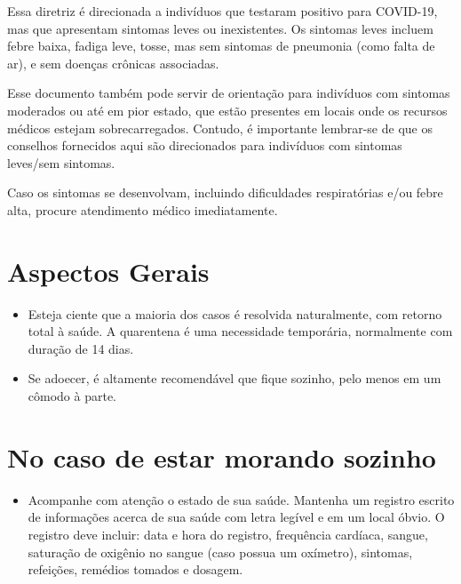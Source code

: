 \documentclass[onecolumn,journal]{IEEEtran}
\begin{document}


\begin{multicols}{2}


Essa diretriz é direcionada a indivíduos que testaram positivo para COVID-19, mas que apresentam sintomas leves ou inexistentes. Os sintomas leves incluem febre baixa, fadiga leve, tosse, mas sem sintomas de pneumonia (como falta de ar), e sem doenças crônicas associadas.
 
Esse documento também pode servir de orientação para indivíduos com sintomas moderados ou até em pior estado, que estão presentes em locais onde os recursos médicos estejam sobrecarregados. Contudo, é importante lembrar-se de que os conselhos fornecidos aqui são direcionados para indivíduos com sintomas leves/sem sintomas.
 
Caso os sintomas se desenvolvam, incluindo dificuldades respiratórias e/ou febre alta, procure atendimento médico imediatamente.


\section*{Aspectos Gerais}
\begin{itemize}
\item  Esteja ciente que a maioria dos casos é resolvida naturalmente, com retorno total à saúde. A quarentena é uma necessidade temporária, normalmente com duração de 14 dias.

\item Se adoecer, é altamente recomendável que fique sozinho, pelo menos em um cômodo à parte.

\end{itemize}

\section*{No caso de estar morando sozinho}
\begin{itemize}
\item Acompanhe com atenção o estado de sua saúde. Mantenha um registro escrito de informações acerca de sua saúde com letra legível e em um local óbvio. O registro deve incluir: data e hora do registro, frequência cardíaca, sangue, saturação de oxigênio no sangue (caso possua um oxímetro), sintomas, refeições, remédios tomados e dosagem.


\end{itemize}
\end{multicols}
\end{document}
